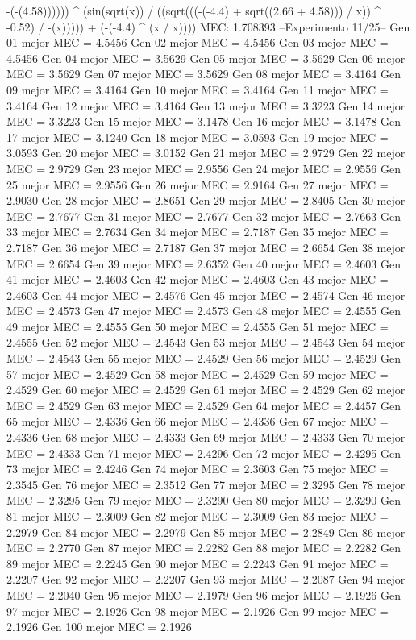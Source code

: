 -(-(4.58)))))) ^ (sin(sqrt(x)) / ((sqrt(((-(-4.4) + sqrt((2.66 + 4.58))) / x)) ^ -0.52) / -(x))))) + (-(-4.4) ^ (x / x))))
MEC: 1.708393
--Experimento 
 11/25--
Gen 01 mejor MEC = 4.5456
Gen 02 mejor MEC = 4.5456
Gen 03 mejor MEC = 4.5456
Gen 04 mejor MEC = 3.5629
Gen 05 mejor MEC = 3.5629
Gen 06 mejor MEC = 3.5629
Gen 07 mejor MEC = 3.5629
Gen 08 mejor MEC = 3.4164
Gen 09 mejor MEC = 3.4164
Gen 10 mejor MEC = 3.4164
Gen 11 mejor MEC = 3.4164
Gen 12 mejor MEC = 3.4164
Gen 13 mejor MEC = 3.3223
Gen 14 mejor MEC = 3.3223
Gen 15 mejor MEC = 3.1478
Gen 16 mejor MEC = 3.1478
Gen 17 mejor MEC = 3.1240
Gen 18 mejor MEC = 3.0593
Gen 19 mejor MEC = 3.0593
Gen 20 mejor MEC = 3.0152
Gen 21 mejor MEC = 2.9729
Gen 22 mejor MEC = 2.9729
Gen 23 mejor MEC = 2.9556
Gen 24 mejor MEC = 2.9556
Gen 25 mejor MEC = 2.9556
Gen 26 mejor MEC = 2.9164
Gen 27 mejor MEC = 2.9030
Gen 28 mejor MEC = 2.8651
Gen 29 mejor MEC = 2.8405
Gen 30 mejor MEC = 2.7677
Gen 31 mejor MEC = 2.7677
Gen 32 mejor MEC = 2.7663
Gen 33 mejor MEC = 2.7634
Gen 34 mejor MEC = 2.7187
Gen 35 mejor MEC = 2.7187
Gen 36 mejor MEC = 2.7187
Gen 37 mejor MEC = 2.6654
Gen 38 mejor MEC = 2.6654
Gen 39 mejor MEC = 2.6352
Gen 40 mejor MEC = 2.4603
Gen 41 mejor MEC = 2.4603
Gen 42 mejor MEC = 2.4603
Gen 43 mejor MEC = 2.4603
Gen 44 mejor MEC = 2.4576
Gen 45 mejor MEC = 2.4574
Gen 46 mejor MEC = 2.4573
Gen 47 mejor MEC = 2.4573
Gen 48 mejor MEC = 2.4555
Gen 49 mejor MEC = 2.4555
Gen 50 mejor MEC = 2.4555
Gen 51 mejor MEC = 2.4555
Gen 52 mejor MEC = 2.4543
Gen 53 mejor MEC = 2.4543
Gen 54 mejor MEC = 2.4543
Gen 55 mejor MEC = 2.4529
Gen 56 mejor MEC = 2.4529
Gen 57 mejor MEC = 2.4529
Gen 58 mejor MEC = 2.4529
Gen 59 mejor MEC = 2.4529
Gen 60 mejor MEC = 2.4529
Gen 61 mejor MEC = 2.4529
Gen 62 mejor MEC = 2.4529
Gen 63 mejor MEC = 2.4529
Gen 64 mejor MEC = 2.4457
Gen 65 mejor MEC = 2.4336
Gen 66 mejor MEC = 2.4336
Gen 67 mejor MEC = 2.4336
Gen 68 mejor MEC = 2.4333
Gen 69 mejor MEC = 2.4333
Gen 70 mejor MEC = 2.4333
Gen 71 mejor MEC = 2.4296
Gen 72 mejor MEC = 2.4295
Gen 73 mejor MEC = 2.4246
Gen 74 mejor MEC = 2.3603
Gen 75 mejor MEC = 2.3545
Gen 76 mejor MEC = 2.3512
Gen 77 mejor MEC = 2.3295
Gen 78 mejor MEC = 2.3295
Gen 79 mejor MEC = 2.3290
Gen 80 mejor MEC = 2.3290
Gen 81 mejor MEC = 2.3009
Gen 82 mejor MEC = 2.3009
Gen 83 mejor MEC = 2.2979
Gen 84 mejor MEC = 2.2979
Gen 85 mejor MEC = 2.2849
Gen 86 mejor MEC = 2.2770
Gen 87 mejor MEC = 2.2282
Gen 88 mejor MEC = 2.2282
Gen 89 mejor MEC = 2.2245
Gen 90 mejor MEC = 2.2243
Gen 91 mejor MEC = 2.2207
Gen 92 mejor MEC = 2.2207
Gen 93 mejor MEC = 2.2087
Gen 94 mejor MEC = 2.2040
Gen 95 mejor MEC = 2.1979
Gen 96 mejor MEC = 2.1926
Gen 97 mejor MEC = 2.1926
Gen 98 mejor MEC = 2.1926
Gen 99 mejor MEC = 2.1926
Gen 100 mejor MEC = 2.1926

